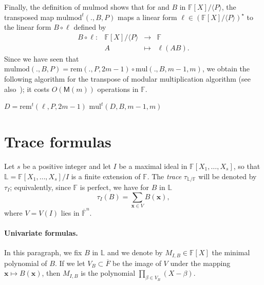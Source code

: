 \documentclass[12pt]{article}
\def\M {\ensuremath{\mathsf{M}}}
\def\F {\ensuremath{\mathbb{F}}}
\def\L {\ensuremath{\mathbb{L}}}
\def\mul {\ensuremath{\mathrm{mul}}}
\def\rem {\ensuremath{\mathrm{rem}}}
\def\mulmod {\ensuremath{\mathrm{mulmod}}}
\def\x {\ensuremath{\mathbf{x}}}
\begin{document}
Finally, the definition of $\mulmod$ shows that for and $B$ in
$\F[X]/\langle P \rangle$, the transposed map $\mulmod^t(.,B,P)$ maps
a linear form $\ell \in (\F[X]/\langle P \rangle)^\star$ to the linear
form $B \circ \ell$ defined by
$$
\begin{array}{cccc}
B \circ \ell: &\F[X]/\langle P \rangle &\to& \F  \\
& A & \mapsto & \ell(A B).
\end{array}$$
Since we have seen that $\mulmod(.,B,P) = \rem(.,P,2m-1) \circ \mul(.,B,m-1,m)$,
we obtain the following algorithm for the transpose of modular multiplication
algorithm (see also~\cite{shoup99,bostan+lecerf+schost:tellegen});
it costs $O(\M(m))$ operations in $\F$.


\begin{algorithm}[H]
  \caption{$\mulmod^t(\ell,B,P)$}
  \begin{algorithmic}[1]
    \STATE $D = \rem^t(\ell,P,2m-1)$
    \RETURN $\mul^t(D, B, m-1, m)$
  \end{algorithmic}
\end{algorithm}


\section{Trace formulas} 

Let $s$ be a positive integer and let $I$ be a maximal ideal in
$\F[X_1,\dots,X_s]$, so that $\L=\F[X_1,\dots,X_s]/I$ is a finite
extension of $\F$.  The {\em trace} $\tau_{\L/\F}$ will be denoted by
$\tau_I$; equivalently, since $\F$ is perfect, we have for $B$ in $\L$
\begin{equation}\label{eq:tr}
\tau_{I}(B)=\sum_{\x \in V} B(\x),
\end{equation}
where $V=V(I)$ lies in $\overline{\F}^n$. 

\paragraph{Univariate formulas.} In this paragraph, we fix $B$ in $\L$ and we 
denote by $M_{I,B} \in \F[X]$ the minimal polynomial of $B$. If we let
$V_B \subset \overline{F}$ be the image of $V$ under the mapping $\x \mapsto
B(\x)$, then $M_{I,B}$ is the polynomial $\prod_{\beta \in
  V_B}(X-\beta)$.
\end{document}
